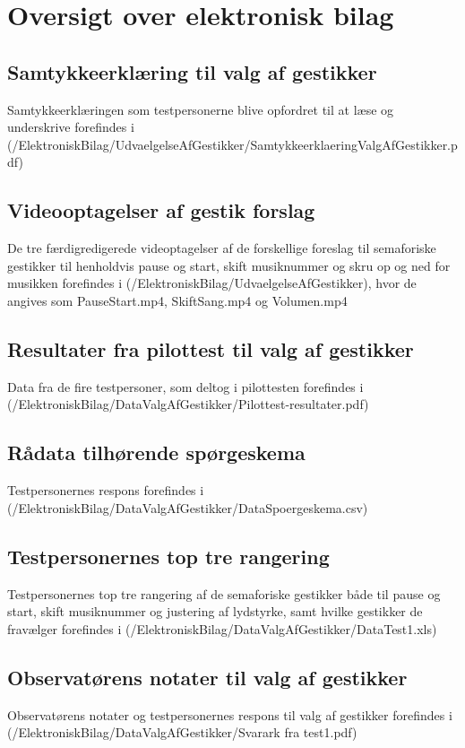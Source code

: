 \chapter{Oversigt over elektronisk bilag}
\label{app:OversigtOverElektroniskBilag}
%
%
\section{Samtykkeerklæring til valg af gestikker}
\label{app:SamtykkeerklaeringValgAfGestikker}
%
Samtykkeerklæringen som testpersonerne blive opfordret til at læse og underskrive forefindes i (/ElektroniskBilag/UdvaelgelseAfGestikker/SamtykkeerklaeringValgAfGestikker.pdf)
%
\section{Videooptagelser af gestik forslag}
\label{app:VideooptagelseGestikForslag}
%
De tre færdigredigerede videoptagelser af de forskellige foreslag til semaforiske gestikker til henholdvis pause og start, skift musiknummer og skru op og ned for musikken forefindes i (/ElektroniskBilag/UdvaelgelseAfGestikker), hvor de angives som PauseStart.mp4, SkiftSang.mp4 og Volumen.mp4
%
\section{Resultater fra pilottest til valg af gestikker}
\label{app:ResultaterPilottestValgAfGestikker}
%
Data fra de fire testpersoner, som deltog i pilottesten forefindes i \\
(/ElektroniskBilag/DataValgAfGestikker/Pilottest-resultater.pdf)
%
\section{Rådata tilhørende spørgeskema}
\label{app:RaaDataSpoergeskema}
%
Testpersonernes respons forefindes i (/ElektroniskBilag/DataValgAfGestikker/DataSpoergeskema.csv)
%
\section{Testpersonernes top tre rangering}
\label{app:TestpersonernesTopTre}
%
Testpersonernes top tre rangering af de semaforiske gestikker både til pause og start, skift musiknummer og justering af lydstyrke, samt hvilke gestikker de fravælger forefindes i (/ElektroniskBilag/DataValgAfGestikker/DataTest1.xls)
%
\section{Observatørens notater til valg af gestikker}
\label{app:NoterValgAfGestikker}
%
Observatørens notater og testpersonernes respons til valg af gestikker forefindes i (/ElektroniskBilag/DataValgAfGestikker/Svarark fra test1.pdf)
%
